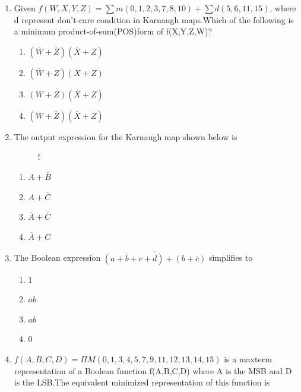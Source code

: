 \documentclass[journal,12pt,twocolumn]{IEEEtran}
\begin{document}
\begin{enumerate}
\begin{enumerate}
    \end{enumerate}
\item Given $f(W,X,Y,Z)=\sum m(0,1,2,3,7,8,10)+\sum d(5,6,11,15)$, where d represent  don't-care condition in Karnaugh maps.Which of the following is a minimum product-of-sum(POS)form of f(X,Y,Z,W)?
     \begin{enumerate}
      \item $(\overline{W}+\overline{Z})(\overline{X}+Z)$
      \item $(\overline{W}+Z)(X+Z)$
      \item $(W+Z)(\overline{X}+Z)$
      \item $(W+\overline{Z})(\overline{X}+Z)$
    \end{enumerate}
    \item The output expression for the Karnaugh map shown below is
\begin{figure}[!h]
\centering
\resizebox {\columnwidth} {!} {

}
\caption{}
\end{figure} 
                        \begin{enumerate}
      \item $A+\overline{B}$
      \item $A+\overline{C}$
      \item $\overline{A}+\overline{C}$
      \item $\overline{A}+C$
    \end{enumerate}
    \item The Boolean expression $\overline{(a+\overline{b}+c+\overline{d})+(b+\overline{c})}$ simplifies to 
    \begin{enumerate}
      \item $1$
      \item $\overline{ab}$
      \item $ab$
      \item $0$
    \end{enumerate}
    \item $f(A,B,C,D)=\Pi M(0,1,3,4,5,7,9,11,12,13,14,15)$ is a maxterm representation of a Boolean function f(A,B,C,D) where A is the  MSB and D is the LSB.The equivalent minimized representation of this function is
   

\end{enumerate}
\end{document}
